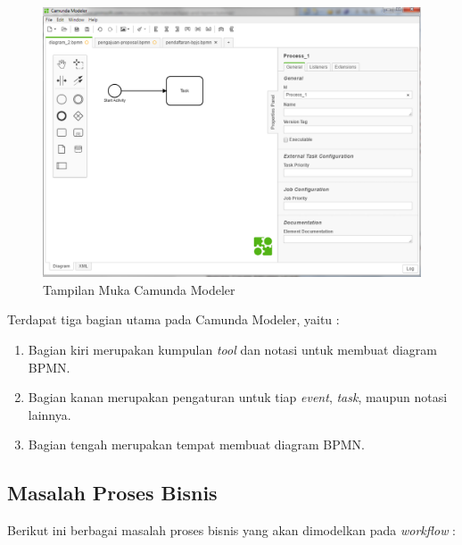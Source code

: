 		\begin{figure}[H]
			\centering
			\includegraphics[scale=0.5]{Gambar/Bab-3/Modeler/1Awal}
			\caption{Tampilan Muka Camunda Modeler} 
			\label{fig:camundaModelerAwal}
		\end{figure}
		
Terdapat tiga bagian utama pada Camunda Modeler, yaitu :
\begin{enumerate}
	\item Bagian kiri merupakan kumpulan \textit{tool} dan notasi untuk membuat diagram BPMN.
	\item Bagian kanan merupakan pengaturan untuk tiap \textit{event}, \textit{task}, maupun notasi lainnya. 
	\item Bagian tengah merupakan tempat membuat diagram BPMN.
\end{enumerate}		


\subsection{Masalah Proses Bisnis}
\label{masalah}
Berikut ini berbagai masalah proses bisnis yang akan dimodelkan pada \textit{workflow} :

